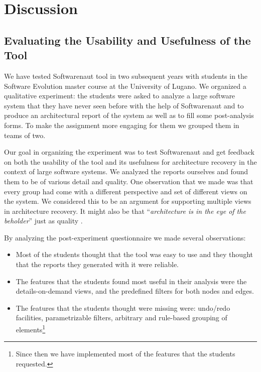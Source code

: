 \documentclass[preprint,12pt]{elsarticle}
\begin{document}



\newpage
\section {Discussion}
\label {sec:disc}

\subsection {Evaluating the Usability and Usefulness of the Tool}
We have tested Softwarenaut tool in two subsequent years with students in the Software Evolution master course at the University of Lugano. We organized a qualitative experiment: the students were asked to analyze a large software system that they have never seen before with the help of Softwarenaut and to produce an architectural report of the system as well as to fill some post-analysis forms. To make the assignment more engaging for them we grouped them in teams of two. 

Our goal in organizing the experiment was to test Softwarenaut and get feedback on both the usability of the tool and its usefulness for architecture recovery in the context of large software systems. We analyzed the reports ourselves and found them to be of various detail and quality. One observation that we made was that every group had come with a different perspective and set of different views on the system. We considered this to be an argument for supporting multiple views in architecture recovery. It might also be that ``{\em architecture is in the eye of the beholder}'' just as quality \cite{bass-architecture}.

By analyzing the post-experiment questionnaire we made several observations:

\begin{itemize}
\item Most of the students thought that the tool was easy to use and they thought that the reports they generated with it were reliable. 
\item The features that the students found most useful in their analysis were the details-on-demand views, and the predefined filters for both nodes and edges.
\item The features that the students thought were missing were: undo/redo facilities, parametrizable filters, arbitrary and rule-based grouping of elements\footnote{Since then we have implemented most of the features that the students requested.}
\end{itemize}
\end{document}
